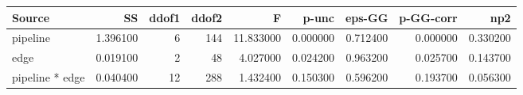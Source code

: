 \begin{tabular}{lrrrrrrrr}
\toprule
Source & SS & ddof1 & ddof2 & F & p-unc & eps-GG & p-GG-corr & np2 \\
\midrule
pipeline & 1.396100 & 6 & 144 & 11.833000 & 0.000000 & 0.712400 & 0.000000 & 0.330200 \\
edge & 0.019100 & 2 & 48 & 4.027000 & 0.024200 & 0.963200 & 0.025700 & 0.143700 \\
pipeline * edge & 0.040400 & 12 & 288 & 1.432400 & 0.150300 & 0.596200 & 0.193700 & 0.056300 \\
\bottomrule
\end{tabular}
